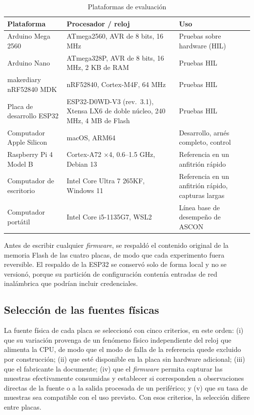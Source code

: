 \begin{table}[H]
\centering
\caption{Plataformas de evaluación}
\label{tab:plataformas}
\begin{tabularx}{\textwidth}{@{}L{0.25\textwidth}L{0.32\textwidth}Y@{}}
\toprule
\textbf{Plataforma} & \textbf{Procesador / reloj} & \textbf{Uso} \\
\midrule
Arduino Mega 2560 & ATmega2560, AVR de 8 bits, 16 MHz & Pruebas sobre hardware (HIL) \\
Arduino Nano & ATmega328P, AVR de 8 bits, 16 MHz, 2 KB de RAM & Pruebas HIL \\
makerdiary nRF52840 MDK & nRF52840, Cortex-M4F, 64 MHz & Pruebas HIL \\
Placa de desarrollo ESP32 & ESP32-D0WD-V3 (rev.~3.1), Xtensa LX6 de doble núcleo, 240 MHz, 4 MB de Flash & Pruebas HIL \\
Computador Apple Silicon & macOS, ARM64 & Desarrollo, arnés completo, control \\
Raspberry Pi 4 Model B & Cortex-A72 ×4, 0.6--1.5 GHz, Debian 13 & Referencia en un anfitrión rápido \\
Computador de escritorio & Intel Core Ultra 7 265KF, Windows 11 & Referencia en un anfitrión rápido, capturas largas \\
Computador portátil & Intel Core i5-1135G7, WSL2 & Línea base de desempeño de ASCON \\
\bottomrule
\end{tabularx}
\end{table}

Antes de escribir cualquier \textit{firmware}, se respaldó el contenido original de la memoria Flash de las cuatro placas, de modo que cada experimento fuera reversible. El respaldo de la ESP32 se conservó solo de forma local y no se versionó, porque su partición de configuración contenía entradas de red inalámbrica que podrían incluir credenciales.

\subsection{Selección de las fuentes físicas}
\label{sec:seleccion_fuentes}

La fuente física de cada placa se seleccionó con cinco criterios, en este orden: (i) que su variación provenga de un fenómeno físico independiente del reloj que alimenta la CPU, de modo que el modo de falla de la referencia quede excluido por construcción; (ii) que esté disponible en la placa sin hardware adicional; (iii) que el fabricante la documente; (iv) que el \textit{firmware} permita capturar las muestras efectivamente consumidas y establecer si corresponden a observaciones directas de la fuente o a la salida procesada de un periférico; y (v) que su tasa de muestras sea compatible con el uso previsto. Con esos criterios, la selección difiere entre placas.

